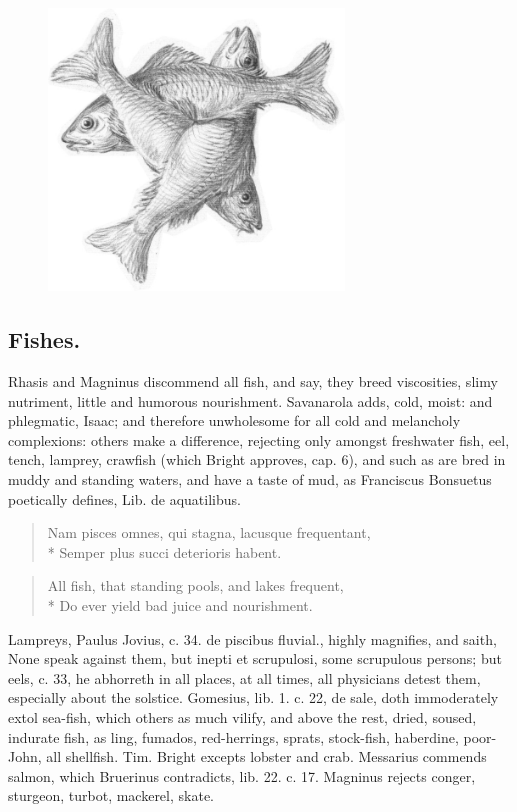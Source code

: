 {{\begin{figure}[H]
  \begingroup
  \centering
  \includegraphics[keepaspectratio,width=0.7\textwidth]{figures/Three-fishes-arranged-crosswise-small.jpg}
  \label{fig:threefishes}
\end{figure}

\subsection{Fishes.}\label{sec:fishes}
Rhasis and Magninus discommend all fish, and say, they
breed viscosities, slimy nutriment, little and humorous nourishment.
Savanarola adds, cold, moist: and phlegmatic, Isaac; and therefore
unwholesome for all cold and melancholy complexions: others make a
difference, rejecting only amongst freshwater fish, eel, tench,
lamprey, crawfish (which Bright approves, cap. 6), and such as are bred
in muddy and standing waters, and have a taste of mud, as Franciscus
Bonsuetus poetically defines, Lib. de aquatilibus.
%
\begin{latin}
\begin{verse}
Nam pisces omnes, qui stagna, lacusque frequentant,\\*
Semper plus succi deterioris habent.
\end{verse}
\end{latin}
\translationrule
\begin{verse}
All fish, that standing pools, and lakes frequent,\\*
Do ever yield bad juice and nourishment.
\end{verse}
%
Lampreys, Paulus Jovius, c. 34. de piscibus fluvial., highly magnifies,
and saith, None speak against them, but inepti et scrupulosi, some
scrupulous persons; but eels, c. 33, he abhorreth in all places,
at all times, all physicians detest them, especially about the
solstice. Gomesius, lib. 1. c. 22, de sale, doth immoderately extol
sea-fish, which others as much vilify, and above the rest, dried,
soused, indurate fish, as ling, fumados, red-herrings, sprats,
stock-fish, haberdine, poor-John, all shellfish. Tim. Bright
excepts lobster and crab. Messarius commends salmon, which Bruerinus
contradicts, lib. 22. c. 17. Magninus rejects conger, sturgeon, turbot,
mackerel, skate.

}}
